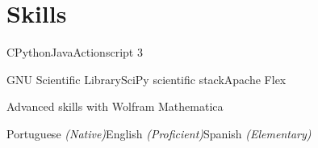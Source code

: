 
\section{Skills}

\begin{cvskills}
	
	{C\dotsep Python\dotsep Java\dotsep Actionscript 3}
	
	{GNU Scientific Library\dotsep SciPy scientific stack\dotsep Apache Flex}
	
	{Advanced skills with Wolfram Mathematica}
	
	
	{Portuguese \textit{(Native)}\dotsep English \textit{(Proficient)}\dotsep Spanish \textit{(Elementary)}}
	
\end{cvskills}


\clearsection
